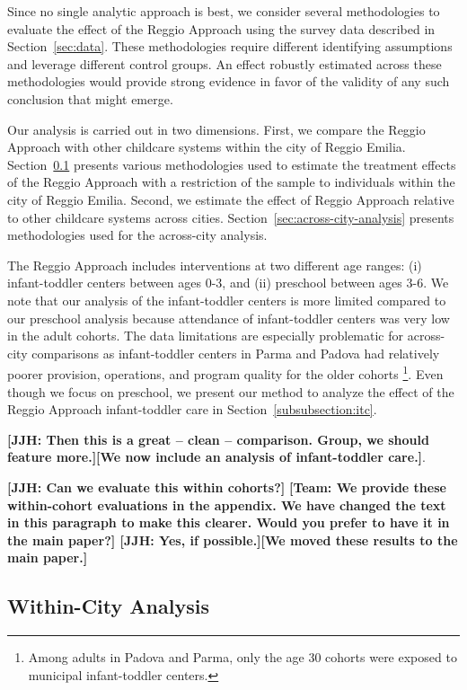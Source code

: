Since no single analytic approach is best, we consider several methodologies to evaluate the effect of the Reggio Approach using the survey data described in Section~\ref{sec:data}. These methodologies require different identifying assumptions and leverage different control groups. An effect robustly estimated across these methodologies would provide strong evidence in favor of the validity of any such conclusion that might emerge.

Our analysis is carried out in two dimensions. First, we compare the Reggio Approach with other childcare systems within the city of Reggio Emilia. Section~\ref{sec:within-city-analysis} presents various methodologies used to estimate the treatment effects of the Reggio Approach with a restriction of the sample to individuals within the city of Reggio Emilia. Second, we estimate the effect of Reggio Approach relative to other childcare systems across cities. Section~\ref{sec:across-city-analysis} presents methodologies used for the across-city analysis.

The Reggio Approach includes interventions at two different age ranges: (i) infant-toddler centers between ages 0-3, and (ii) preschool between ages 3-6. We note that our analysis of the infant-toddler centers is more limited compared to our preschool analysis because attendance of infant-toddler centers was very low in the adult cohorts. The data limitations are especially problematic for across-city comparisons as infant-toddler centers in Parma and Padova had relatively poorer provision, operations, and program quality for the older cohorts \footnote{Among adults in Padova and Parma, only the age 30 cohorts were exposed to municipal infant-toddler centers.}. Even though we focus on preschool, we present our method to analyze the effect of the Reggio Approach infant-toddler care in Section~\ref{subsubsection:itc}.

\textbf{[JJH: Then this is a great -- clean -- comparison. Group, we should feature more.][We now include an analysis of infant-toddler care.]}. 

\textbf{[JJH: Can we evaluate this within cohorts?]} \textbf{[Team: We provide these within-cohort evaluations in the appendix. We have changed the text in this paragraph to make this clearer. Would you prefer to have it in the main paper?] [JJH: Yes, if possible.][We moved these results to the main paper.]}

\subsection{Within-City Analysis} \label{sec:within-city-analysis}

